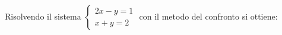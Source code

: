Risolvendo il sistema 
$\displaystyle
\left\{
\begin{array}{l}
\displaystyle 2x - y = 1 \\
\displaystyle x + y = 2
\end{array}
\right.
$
con il metodo del confronto si ottiene:
